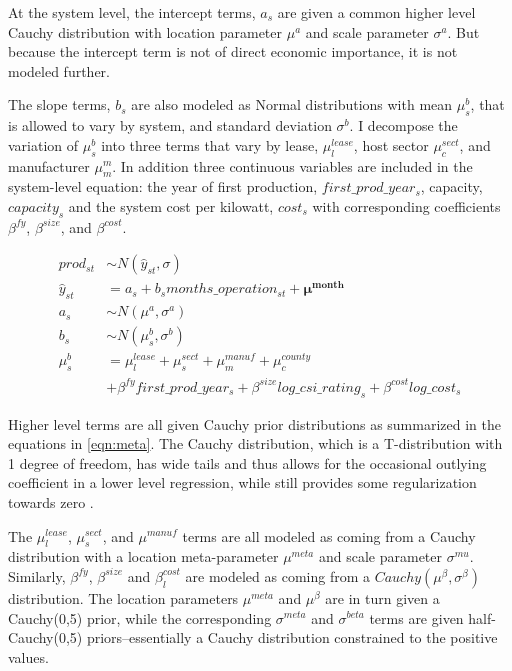 \documentclass[a4paper]{article}
\begin{document}
At the system level, the intercept terms, $a_s$ are given a common higher level Cauchy distribution with location parameter $\mu^a$ and scale parameter $\sigma^a$. But because the intercept term is not of direct economic importance, it is not modeled further.

The slope terms, $b_s$ are also modeled as Normal distributions with mean $\mu^{b}_s$, that is allowed to vary by system, and standard deviation $\sigma^{b}$. I decompose the variation of $\mu^{b}_s$ into three terms that vary by lease, $\mu^{lease}_l$, host sector $\mu^{sect}_c$, and manufacturer $\mu^m_m$. In addition three continuous variables are included in the system-level equation: the year of first production, $first\_prod\_year_s$, capacity, $capacity_s$ and the system cost per kilowatt, $cost_s$ with corresponding coefficients $\beta^{fy}$, $\beta^{size}$, and $\beta^{cost}$.

\begin{equation}
\begin{aligned}
prod_{st} &\sim N(\hat{y}_{st}, \sigma)\\ %
\hat{y}_{st} &= a_s + b_s months\_operation_{st} + \mathbf{\mu^{month}}\\
a_s &\sim N(\mu^a, \sigma^a)  \label{eqn:bayesMod} \\
b_s &\sim N(\mu_s^b, \sigma^b) \\
\mu_{s}^{b} & = \mu^{lease}_l + \mu^{sect}_s + \mu^{manuf}_m + \mu^{county}_c  \\
& +\beta^{fy} first\_prod\_year_s + \beta^{size} log\_csi\_rating_s + \beta^{cost} log\_cost_s
\end{aligned}
\end{equation}

Higher level terms are all given Cauchy prior distributions as summarized in the equations in \ref{eqn:meta}. The Cauchy distribution, which is a T-distribution with 1 degree of freedom, has wide tails and thus allows for the occasional outlying coefficient in a lower level regression, while still provides some regularization towards zero \citep{gelman_weakly_2008}.

The $\mu^{lease}_l$, $\mu^{sect}_s$, and $\mu^{manuf}$ terms are all
modeled as coming from a Cauchy distribution with a location meta-parameter $\mu^{meta}$ and scale parameter $\sigma^{mu}$. Similarly, $\beta^{fy}$, $\beta^{size}$ and $\beta^{cost}_l$ are modeled as coming from a $Cauchy(\mu^{\beta}, \sigma^{\beta})$ distribution. The location parameters $\mu^{meta}$ and $\mu^{\beta}$ are in turn given a Cauchy(0,5) prior, while the corresponding $\sigma^{meta}$ and $\sigma^{beta}$ terms are given half-Cauchy(0,5) priors--essentially a Cauchy distribution constrained to the positive values.
\end{document}

